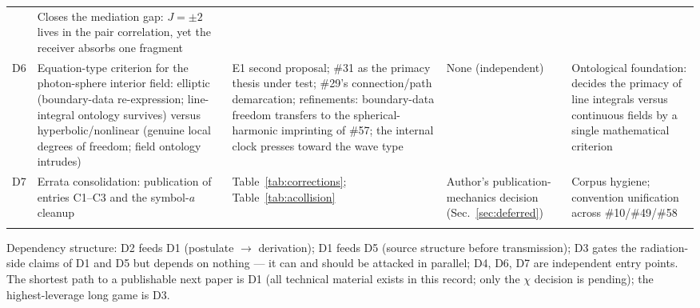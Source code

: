 \documentclass[%
 reprint, amsmath,amssymb, aps, prb, ]{revtex4-2}
\numberwithin{equation}{section}
\begin{document}
\begin{table}[t!]
\begin{tabular}{p{0.8cm}p{4.6cm}p{3.4cm}p{3.0cm}p{3.2cm}}
& Closes the mediation gap: $J=\pm2$ lives in the pair correlation, yet the receiver absorbs one fragment \\
\addlinespace[0.3cm]
D6
& Equation-type criterion for the photon-sphere interior field: elliptic (boundary-data re-expression; line-integral ontology survives) versus hyperbolic/nonlinear (genuine local degrees of freedom; field ontology intrudes)
& E1 second proposal; \#31 as the primacy thesis under test; \#29's connection/path demarcation; refinements: boundary-data freedom transfers to the spherical-harmonic imprinting of \#57; the internal clock presses toward the wave type
& None (independent)
& Ontological foundation: decides the primacy of line integrals versus continuous fields by a single mathematical criterion \\
\addlinespace[0.3cm]
D7
& Errata consolidation: publication of entries C1--C3 and the symbol-$a$ cleanup
& Table~\ref{tab:corrections}; Table~\ref{tab:acollision}
& Author's publication-mechanics decision (Sec.~\ref{sec:deferred})
& Corpus hygiene; convention unification across \#10/\#49/\#58 \\
\addlinespace[0.2cm]
\bottomrule
\end{tabular}
\vspace{0.2cm}
\begin{minipage}{0.95\textwidth}
\justifying\footnotesize
Dependency structure: D2 feeds D1 (postulate $\to$ derivation); D1 feeds D5 (source structure before transmission); D3 gates the radiation-side claims of D1 and D5 but depends on nothing --- it can and should be attacked in parallel; D4, D6, D7 are independent entry points. The shortest path to a publishable next paper is D1 (all technical material exists in this record; only the $\chi$ decision is pending); the highest-leverage long game is D3.
\end{minipage}
\end{table}
\end{document}
